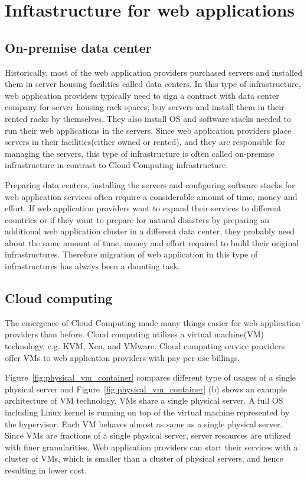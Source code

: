 \section{Inftastructure for web applications}

\subsection{On-premise data center}

Historically, most of the web application providers purchased servers and installed them in server housing facilities called data centers.
In this type of infrastructure, web application providers typically need to sign a contract with data center company for server housing rack spaces, buy servers and install them in their rented racks by themselves.
They also install OS and software stacks needed to run their web applications in the servers.
Since web application providers place servers in their facilities(either owned or rented), and they are responsible for managing the servers, this type of infrastructure is often called on-premise infrastructure in contrast to Cloud Computing infrastructure.

Preparing data centers, installing the servers and configuring software stacks for web application services often require a considerable amount of time, money and effort.
If web application providers want to expand their services to different countries or if they want to prepare for natural disasters by preparing an additional web application cluster in a different data center, they probably need about the same amount of time, money and effort required to build their original infrastructures.
Therefore migration of web application in this type of infrastructures has always been a daunting task.

\subsection{Cloud computing}

The emergence of Cloud Computing made many things easier for web application providers than before.
Cloud computing utilizes a virtual machine(VM) technology, e.g. KVM, Xen, and VMware.
Cloud computing service providers offer VMs to web application providers with pay-per-use billings.

Figure~\ref{fig:physical_vm_container} compares different type of usages of a single physical server and Figure~\ref{fig:physical_vm_container} (b) shows an example architecture of VM technology.
VMs share a single physical server.
A full OS including Linux kernel is running on top of the virtual machine represented by the hypervisor.
Each VM behaves almost as same as a single physical server.
Since VMs are fractions of a single physical server, server resources are utilized with finer granularities.
Web application providers can start their services with a cluster of VMs, which is smaller than a cluster of physical servers, and hence resulting in lower cost.

